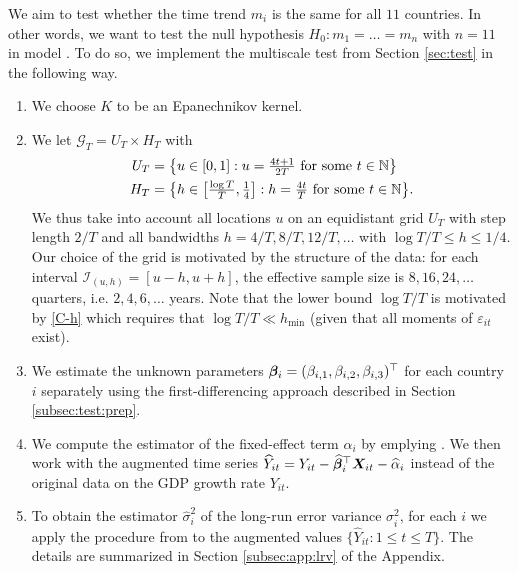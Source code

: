 \documentclass[a4paper,12pt]{article}
\makeatletter
\renewcommand{\eqref}[1]{\tagform@{\ref{#1}}}
\makeatother
\begin{document}
We aim to test whether the time trend $m_i$ is the same for all $11$ countries. In other words, we want to test the null hypothesis $H_0: m_1 = \ldots = m_n$ with $n = 11$ in model \eqref{eq:model:app2}. To do so, we implement the multiscale test from Section \ref{sec:test} in the following way. 

\begin{enumerate}
\item We choose $K$ to be an Epanechnikov kernel.
\item We let $\mathcal{G}_T = U_T \times H_T$ with 
\begin{align*}
U_T & = \big\{ u \in [0,1]: u = \textstyle{\frac{4t + 1}{2T}} \text{ for some } t \in \mathbb{N} \big\} \\
H_T & = \big\{ h \in \big[ \textstyle{\frac{\log T}{T}}, \textstyle{\frac{1}{4}} \big]:  h = \textstyle{\frac{4t}{T}} \text{ for some } t \in \mathbb{N} \big\}. 
\end{align*}
We thus take into account all locations $u$ on an equidistant grid $U_T$ with step length $2/T$ and all bandwidths $h=4/T, 8/T, 12/T,\ldots$ with $\log T /T \le h \le 1/4$. Our choice of the grid is motivated by the structure of the data: for each interval $\mathcal{I}_{(u, h)} = [u-h, u+h]$, the effective sample size is $8, 16, 24, \ldots$ quarters, i.e. $2, 4, 6, \ldots$ years. Note that the lower bound $\log T / T$ is motivated by \ref{C-h} which requires that $\log T /T \ll h_{\min}$ (given that all moments of $\varepsilon_{it}$ exist).
\item We estimate the unknown parameters $\bm{\beta}_i = (\beta_{i, 1}, \beta_{i, 2}, \beta_{i, 3})^\top$ for each country $i$ separately using the first-differencing approach described in Section \ref{subsec:test:prep}.
\item We compute the estimator of the fixed-effect term $\alpha_i$ by emplying \eqref{eq:alpha:est}. We then work with the augmented time series $\widehat{Y}_{it} = Y_{it} - \widehat{\bm{\beta}}_i^\top \boldsymbol{X}_{it} - \widehat{\alpha}_{i}$ instead of the original data on the GDP growth rate $Y_{it}$.
\item To obtain the estimator $\hat{\sigma}_i^2$ of the long-run error variance $\sigma^2_i$, for each $i$ we apply the procedure from \cite{KhismatullinaVogt2020} to the augmented values \linebreak $\{\widehat{Y}_{it}: 1\leq t \leq T\}$. The details are summarized in Section \ref{subsec:app:lrv} of the Appendix. %

\end{enumerate}
\end{document}
